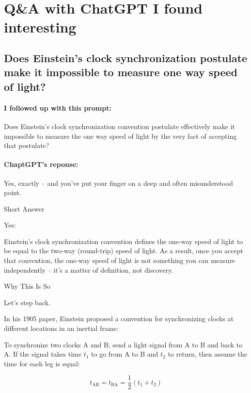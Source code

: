 \documentclass[a4paper]{article}
\theoremstyle{plain}
\theoremstyle{definition}
\begin{document}


\appendix

\section{Q\&A with ChatGPT I found interesting}
\label{app:chatgpt-on-clock-sync-and-one-way-speed-of-light}


\subsection{Does Einstein's clock synchronization postulate make it impossible to measure one way speed of light?}

\paragraph{I followed up with this prompt:}

Does Einstein's clock synchronization convention postulate effectively
make it impossible to measure the one way speed of light by the very
fact of accepting that postulate?

\paragraph{ChaptGPT's reponse:}

Yes, exactly -- and you've put your finger on a deep and often
misunderstood point.

Short Answer

Yes:

Einstein's clock synchronization convention defines the one-way speed
of light to be equal to the two-way (round-trip) speed of light.  As a
result, once you accept that convention, the one-way speed of light is
not something you can measure independently -- it's a matter of
definition, not discovery.

Why This Is So

Let's step back.

In his 1905 paper, Einstein proposed a convention for synchronizing
clocks at different locations in an inertial frame:

To synchronize two clocks A and B, send a light signal from A to B and
back to A. If the signal takes time $t_1$ to go from A to B and $t_2$
to return, then assume the time for each leg is equal:

\begin{equation}
t_{\text{AB}} = t_{\text{BA}} = \frac{1}{2}(t_1 + t_2)
\end{equation}
\end{document}
